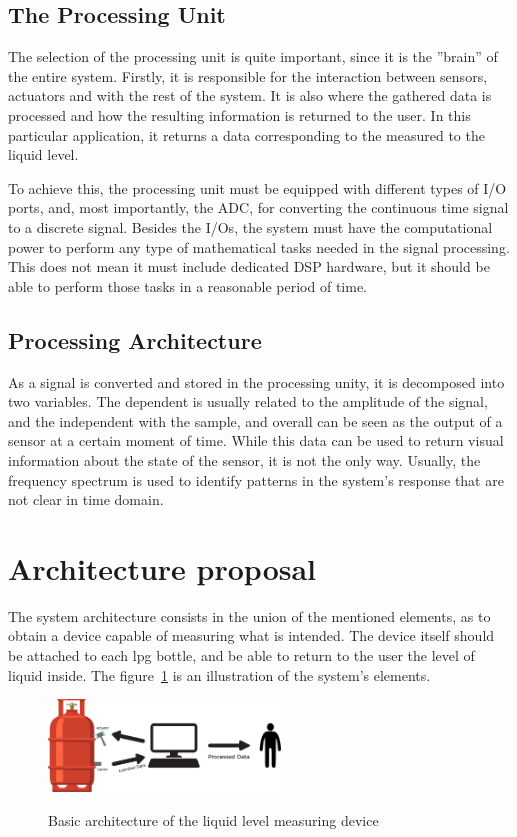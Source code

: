\subsection*{The Processing Unit}
The selection of the processing unit is quite important, since it is the ”brain” of the entire system. Firstly, it is responsible for the interaction between sensors, actuators and with the rest of the system. It is also where the gathered data is processed and how the resulting information is returned to the user. In this particular application, it returns a data corresponding to the measured to the liquid level.

To achieve this, the processing unit must be equipped with different types of I/O ports, and, most importantly, the ADC, for converting the continuous time signal to a discrete signal. Besides the I/Os, the system must have the computational power to perform any type of mathematical tasks needed in the signal processing. This does not mean it must include dedicated DSP hardware, but it should be able to perform those tasks in a reasonable period of time.

 
\subsection*{Processing Architecture}
As a signal is converted and stored in the processing unity, it is decomposed into two variables. The dependent is usually related to the amplitude of the signal, and the independent with the sample, and overall can be seen as the output of a sensor at a certain moment of time. While this data can be used to return visual information about the state of the sensor, it is not the only way. Usually, the frequency spectrum is used to identify patterns in the system’s response that are not clear in time domain.

\section{Architecture proposal} 
The system architecture consists in the union of the mentioned elements, as to obtain a device capable of measuring what is intended. The device itself should be attached to each \acrshort{lpg} bottle, and be able to return to the user the level of liquid inside. The figure~\ref{fig:systemArch} is an illustration of the system’s elements.

\begin{figure}[]
    \centering
    \includegraphics[width=0.55\textwidth]{Chapters/3CHP/Images/bottleBaseAct.eps}
    \caption{Basic architecture of the liquid level measuring device}{}
    \label{fig:systemArch}
\end{figure}


